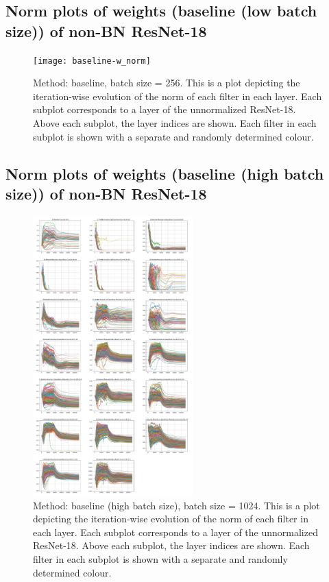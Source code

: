 \documentclass[times,sort&compress]{elsarticle}
\begin{document}
\newpage \subsection{Norm plots of weights (baseline (low batch size)) of non-BN
ResNet-18}
\begin{figure}[h] \centering \texttt{[image: baseline-w\_norm]}
\caption{ Method: baseline, batch size = 256. This is a plot depicting the
iteration-wise evolution of the norm of each filter in each layer. Each subplot
corresponds to a layer of the unnormalized ResNet-18. Above each subplot, the layer
indices are shown. Each filter in each subplot is shown with a separate and randomly
determined colour. } \end{figure}

\newpage \subsection{Norm plots of weights (baseline (high batch size)) of non-BN
ResNet-18}
\begin{figure}[h] \centering
\includegraphics[width=0.55\textwidth]{baseline_high_bs-w_norm} \caption{ Method:
baseline (high batch size), batch size = 1024. This is a plot depicting the
iteration-wise evolution of the norm of each filter in each layer. Each subplot
corresponds to a layer of the unnormalized ResNet-18. Above each subplot, the layer
indices are shown. Each filter in each subplot is shown with a separate and randomly
determined colour. } \end{figure}
\end{document}
